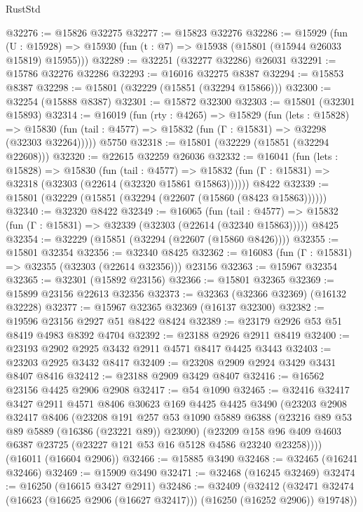 \begin{lexlean}{RustStd}
\begin{coremodule}
@32276 := @15826 @32275
@32277 := @15823 @32276
@32286 := @15929
    (fun (U : @15928) => @15930 (fun (t : @7) => @15938 (@15801 (@15944 @26033 @15819) @15955)))
@32289 := @32251 (@32277 @32286) @26031
@32291 := @15786 @32276 @32286
@32293 := @16016 @32275 @8387
@32294 := @15853 @8387
@32298 := @15801 (@32229 (@15851 (@32294 @15866)))
@32300 := @32254 (@15888 @8387)
@32301 := @15872 @32300
@32303 := @15801 (@32301 @15893)
@32314 := @16019
    (fun (rty : @4265) =>
    @15829
      (fun (lets : @15828) =>
      @15830 (fun (tail : @4577) => @15832 (fun (Γ : @15831) => @32298 (@32303 @32264)))))
    @5750
@32318 := @15801 (@32229 (@15851 (@32294 @22608)))
@32320 := @22615 @32259 @26036
@32332 := @16041
    (fun (lets : @15828) =>
    @15830
      (fun (tail : @4577) =>
      @15832 (fun (Γ : @15831) => @32318 (@32303 (@22614 (@32320 @15861 @15863))))))
    @8422
@32339 := @15801 (@32229 (@15851 (@32294 (@22607 (@15860 (@8423 @15863))))))
@32340 := @32320 @8422
@32349 := @16065
    (fun (tail : @4577) => @15832 (fun (Γ : @15831) => @32339 (@32303 (@22614 (@32340 @15863)))))
    @8425
@32354 := @32229 (@15851 (@32294 (@22607 (@15860 @8426))))
@32355 := @15801 @32354
@32356 := @32340 @8425
@32362 := @16083 (fun (Γ : @15831) => @32355 (@32303 (@22614 @32356))) @23156
@32363 := @15967 @32354
@32365 := @32301 (@15892 @23156)
@32366 := @15801 @32365
@32369 := @15899 @23156 @22613 @32356
@32373 := @32363 (@32366 @32369) (@16132 @32228)
@32377 := @15967 @32365 @32369 (@16137 @32300)
@32382 := @19596 @23156 @2927 @51 @8422 @8424
@32389 := @23179 @2926 @53 @51 @8419 @4983 @8392 @4704
@32392 := @23188 @2926 @2911 @8419
@32400 := @23193 @2902 @2925 @3432 @2911 @4571 @8417 @4425 @3443
@32403 := @23203 @2925 @3432 @8417
@32409 := @23208 @2909 @2924 @3429 @3431 @8407 @8416
@32412 := @23188 @2909 @3429 @8407
@32416 := @16562 @23156 @4425 @2906 @2908
@32417 := @54 @1090
@32465 := @32416
    @32417
    @3427
    @2911
    @4571
    @8406
    @30623
    @169
    @4425
    @4425
    @3490
    (@23203
      @2908
      @32417
      @8406
      (@23208
        @191
        @257
        @53
        @1090
        @5889
        @6388
        (@23216 @89 @53 @89 @5889 (@16386 (@23221 @89)) @23090)
        (@23209 @158 @96 @409 @4603 @6387 @23725 (@23227 @121 @53 @16 @5128 @4586 @23240 @23258))))
    (@16011 (@16604 @2906))
@32466 := @15885 @3490
@32468 := @32465 (@16241 @32466)
@32469 := @15909 @3490
@32471 := @32468 (@16245 @32469)
@32474 := @16250 (@16615 @3427 @2911)
@32486 := @32409
    (@32412 (@32471 @32474 (@16623 (@16625 @2906 (@16627 @32417))) (@16250 (@16252 @2906)) @19748))

\end{coremodule}
\end{lexlean}
